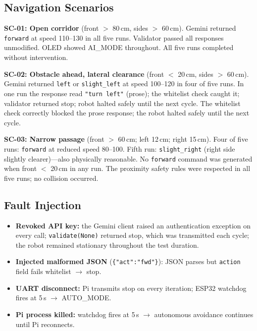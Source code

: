 \documentclass[conference]{IEEEtran}
\begin{document}
\subsection{Navigation Scenarios}

\textbf{SC-01: Open corridor} (front $>$ 80\,cm, sides $>$ 60\,cm).
Gemini returned \texttt{forward} at speed 110--130 in all five runs.
Validator passed all responses unmodified. OLED showed AI\_MODE throughout.
All five runs completed without intervention.

\textbf{SC-02: Obstacle ahead, lateral clearance}
(front $<$ 20\,cm, sides $>$ 60\,cm).
Gemini returned \texttt{left} or \texttt{slight\_left} at speed 100--120
in four of five runs.
In one run the response read \texttt{"turn left"} (prose);
the whitelist check caught it; validator returned stop;
robot halted safely until the next cycle.
The whitelist check correctly blocked the prose response; the robot halted safely until the next cycle.

\textbf{SC-03: Narrow passage} (front $>$ 60\,cm; left 12\,cm; right 15\,cm).
Four of five runs: \texttt{forward} at reduced speed 80--100.
Fifth run: \texttt{slight\_right} (right side slightly clearer)---also
physically reasonable.
No \texttt{forward} command was generated when front $<$ 20\,cm in any run.
The proximity safety rules were respected in all five runs; no collision occurred.

\subsection{Fault Injection}

\begin{itemize}[leftmargin=*, nosep]
  \item \textbf{Revoked API key:} the Gemini client raised an authentication
        exception on every call; \texttt{validate(None)} returned stop,
        which was transmitted each cycle; the robot remained stationary
        throughout the test duration.
  \item \textbf{Injected malformed JSON} (\texttt{\{"act":"fwd"\}}):
        JSON parses but \texttt{action} field fails whitelist $\to$ stop.
  \item \textbf{UART disconnect:} Pi transmits stop on every iteration;
        ESP32 watchdog fires at 5\,s $\to$ AUTO\_MODE.
  \item \textbf{Pi process killed:} watchdog fires at 5\,s $\to$ autonomous
        avoidance continues until Pi reconnects.
\end{itemize}
\end{document}
